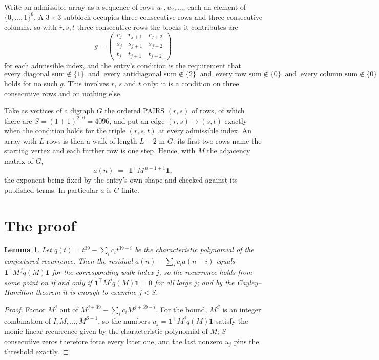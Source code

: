 \documentclass[11pt,a4paper]{article}
\theoremstyle{plain}
\newtheorem{lemma}[theorem]{Lemma}
\theoremstyle{definition}
\begin{document}
Write an admissible array as a sequence of rows $u_1,u_2,\dots$, each an element of
$\{0,\dots,1\}^{6}$. A $3\times3$ subblock occupies three consecutive rows and
three consecutive columns, so with $r,s,t$ three consecutive rows the blocks it
contributes are
\[
g=\begin{pmatrix}r_j&r_{j+1}&r_{j+2}\\ s_j&s_{j+1}&s_{j+2}\\ t_j&t_{j+1}&t_{j+2}\end{pmatrix}
\]
for each admissible index, and the entry's condition is the requirement that
\[
\text{every diagonal sum} \notin \{1\}\ \text{ and }\ \text{every antidiagonal sum} \notin \{2\}\ \text{ and }\ \text{every row sum} \notin \{0\}\ \text{ and }\ \text{every column sum} \notin \{0\}
\]
holds for no such $g$. This involves $r$, $s$ and $t$ only: it is a condition on
three consecutive rows and on nothing else.

Take as vertices of a digraph $G$ the ordered PAIRS $(r,s)$ of rows, of which there are
$S=(1+1)^{2\cdot6}=4096$, and put an edge $(r,s)\to(s,t)$ exactly when the condition
holds for the triple $(r,s,t)$ at every admissible index. An array with $L$ rows is then a
walk of length $L-2$ in $G$: its first two rows name the starting vertex and each further
row is one step. Hence, with $M$ the adjacency matrix of $G$,
\[
a(n)\;=\;\,\mathbf{1}^{\!\top}M^{\,n-1+1}\mathbf{1},
\]
the exponent being fixed by the entry's own shape and checked against its published terms.
In particular $a$ is $C$-finite.

\section{The proof}

\begin{lemma}\label{lem:crit}
Let $q(t)=t^{39}-\sum_i c_it^{39-i}$ be the characteristic polynomial of the
conjectured recurrence. Then the residual $a(n)-\sum_ic_ia(n-i)$ equals
$\mathbf{1}^{\!\top}M^{\,j}q(M)\mathbf{1}$ for the corresponding walk index
$j$, so the recurrence holds from some point on if and only if
$\mathbf{1}^{\!\top}M^{j}q(M)\mathbf{1}=0$ for all large $j$; and by the
Cayley--Hamilton theorem it is enough to examine $j<S$.
\end{lemma}

\begin{proof}
Factor $M^{j}$ out of $M^{j+39}-\sum_ic_iM^{j+39-i}$. For the bound, $M^{S}$
is an integer combination of $I,M,\dots,M^{S-1}$, so the numbers
$u_j=\mathbf{1}^{\!\top}M^{j}q(M)\mathbf{1}$ satisfy the monic linear recurrence given by
the characteristic polynomial of $M$; $S$ consecutive zeros therefore force every later one,
and the last nonzero $u_j$ pins the threshold exactly.
\end{proof}
\end{document}
